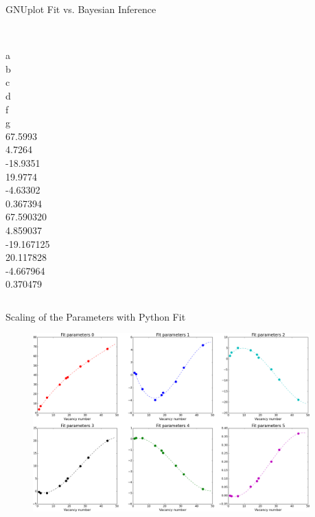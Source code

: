 \documentclass[10pt]{beamer}
\begin{document}
\begin{frame}{GNUplot Fit vs. Bayesian Inference}
	\vspace{-1mm}
	\begin{columns}[c]
 		 \\
		a \\
		b \\
		c \\
		d \\
		f \\
		g  
 		 \\
		67.5993 \\
		4.7264 \\
		-18.9351 \\
		19.9774 \\
		-4.63302 \\
		0.367394 
 		 \\
		67.590320 \\
		4.859037 \\
		-19.167125 \\
		20.117828 \\
		-4.667964 \\
		0.370479
	\end{columns}
\end{frame}

\begin{frame}{Scaling of the Parameters with Python Fit}
	\begin{figure}
        \includegraphics[width=0.95\textwidth]{parametersIN}
    \end{figure}
\end{frame}
\end{document}

